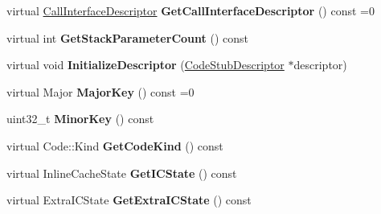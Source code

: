 \begin{DoxyCompactItemize}
\item 
virtual \hyperlink{classv8_1_1internal_1_1_call_interface_descriptor}{Call\+Interface\+Descriptor} {\bfseries Get\+Call\+Interface\+Descriptor} () const  =0\hypertarget{classv8_1_1internal_1_1_b_a_s_e___e_m_b_e_d_d_e_d_aec4fd654d799348b25e1fb777352a940}{}\label{classv8_1_1internal_1_1_b_a_s_e___e_m_b_e_d_d_e_d_aec4fd654d799348b25e1fb777352a940}

\item 
virtual int {\bfseries Get\+Stack\+Parameter\+Count} () const \hypertarget{classv8_1_1internal_1_1_b_a_s_e___e_m_b_e_d_d_e_d_a5e6a91b772fb12e0e7cd9968ad57698f}{}\label{classv8_1_1internal_1_1_b_a_s_e___e_m_b_e_d_d_e_d_a5e6a91b772fb12e0e7cd9968ad57698f}

\item 
virtual void {\bfseries Initialize\+Descriptor} (\hyperlink{classv8_1_1internal_1_1_code_stub_descriptor}{Code\+Stub\+Descriptor} $\ast$descriptor)\hypertarget{classv8_1_1internal_1_1_b_a_s_e___e_m_b_e_d_d_e_d_a68934ed47e1886f0424a5b65086030e4}{}\label{classv8_1_1internal_1_1_b_a_s_e___e_m_b_e_d_d_e_d_a68934ed47e1886f0424a5b65086030e4}

\item 
virtual Major {\bfseries Major\+Key} () const  =0\hypertarget{classv8_1_1internal_1_1_b_a_s_e___e_m_b_e_d_d_e_d_af363bf624482d471f012f4a3d071f724}{}\label{classv8_1_1internal_1_1_b_a_s_e___e_m_b_e_d_d_e_d_af363bf624482d471f012f4a3d071f724}

\item 
uint32\+\_\+t {\bfseries Minor\+Key} () const \hypertarget{classv8_1_1internal_1_1_b_a_s_e___e_m_b_e_d_d_e_d_a65193cde94b18669602bf07e5052aae3}{}\label{classv8_1_1internal_1_1_b_a_s_e___e_m_b_e_d_d_e_d_a65193cde94b18669602bf07e5052aae3}

\item 
virtual Code\+::\+Kind {\bfseries Get\+Code\+Kind} () const \hypertarget{classv8_1_1internal_1_1_b_a_s_e___e_m_b_e_d_d_e_d_a74e2ff66457d9bcb54aafe486d83441a}{}\label{classv8_1_1internal_1_1_b_a_s_e___e_m_b_e_d_d_e_d_a74e2ff66457d9bcb54aafe486d83441a}

\item 
virtual Inline\+Cache\+State {\bfseries Get\+I\+C\+State} () const \hypertarget{classv8_1_1internal_1_1_b_a_s_e___e_m_b_e_d_d_e_d_aef54fe21f8f1d0fcf6d1fc3aafff5bf4}{}\label{classv8_1_1internal_1_1_b_a_s_e___e_m_b_e_d_d_e_d_aef54fe21f8f1d0fcf6d1fc3aafff5bf4}

\item 
virtual Extra\+I\+C\+State {\bfseries Get\+Extra\+I\+C\+State} () const \hypertarget{classv8_1_1internal_1_1_b_a_s_e___e_m_b_e_d_d_e_d_a5fb6299deb02a50c6e47d8c4a9d409fa}{}\label{classv8_1_1internal_1_1_b_a_s_e___e_m_b_e_d_d_e_d_a5fb6299deb02a50c6e47d8c4a9d409fa}


\end{DoxyCompactItemize}
